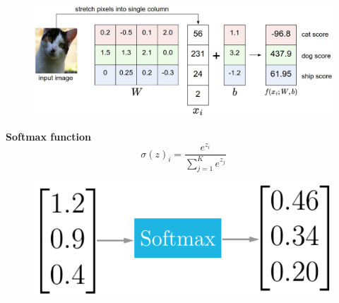 \documentclass[10pt, compress]{beamer}
\begin{document}
\begin{frame}
  \vspace{0.6cm}

  \begin{figure}
    \includegraphics[width=.85\linewidth]{imgs/softmax_1}
  \end{figure}

  \begin{multicols}{2}
    \textbf{Softmax function} \\
  $$ \sigma (z)_i = \frac{e^{z_i}}{\sum_{j=1}^K e^{z_j}}$$
  \columnbreak
  \begin{figure}
    \includegraphics[width=.9\linewidth]{imgs/softmax_3}
  \end{figure}

  \end{multicols}
\end{frame}
\end{document}
